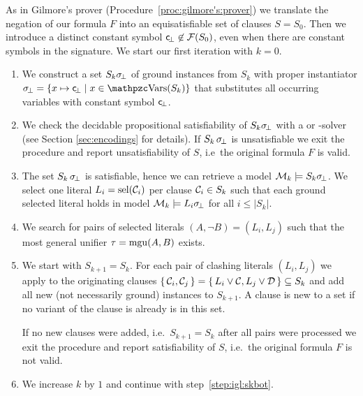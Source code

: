 \begin{procedure}\label{proc:inst:gen:loop}
	As in Gilmore's prover (Procedure~\ref{proc:gilmore's:prover})
	we translate the negation of our formula \( F \) into an equisatisfiable set of clauses
	\( S = S_0 \). Then we introduce a distinct constant symbol
	\( \mathsf{c} \!_\bot\not\in\mathcal{F}(S_0) \), even when there are constant symbols in the signature.
	We start our first iteration with \( k=0 \).

	\begin{enumerate}
		\item\label{step:igl:skbot}
		We construct a set \( S_{k}\sigma \!_\bot \) of ground instances from \( S_k \)
		with proper instantiator \( \subsbot = \{ x\mapsto \consbot \mid x\in\var(S_k) \} \)
		that substitutes all occurring variables with constant symbol \( \mathsf{c} \!_\bot \).
%
		\item\label{step:igl:sksat} 
		We check the decidable propositional satisfiability of
		\( S_k\sigma \!_\bot \) with a \SAT{} or \SMT{}-solver
		(see Section \vref{sec:encodings} for details).
		If \( S_k \, \sigma \!_\bot \) is unsatisfiable
		we exit the procedure 
		and report
		{ unsatisfiability} of \( S \), i.e~the original formula \( F \) is valid.

		\item\label{step:igl:model} The set \( S_k \, \sigma \!_\bot \) is satisfiable, hence we can retrieve a model \( \mathcal{M}_k \models S_k\sigma \!_\bot \).
		We select one literal \( L_i = \operatorname{sel}(\mathcal{C}_i) \) per clause \( \mathcal{C}_i \in S_k \)
		such that each ground selected literal holds in model
		\( \mathcal{M}_k\models L_i\sigma \!_\bot \) for all \( i \leq | S_k | \).

		\item\label{step:igl:clashes} We search for pairs of selected literals
		\( (A, \lnot B) = (L_i, L_j) \)
		such that the most general unifier \( \tau = \operatorname{mgu}(A,B) \) exists.

		\item We start with \( S_{k+1} = S_k \). For each pair of clashing literals
		\( (L_i, L_j) \)
		we apply \InstGen{} to the originating clauses
		\( \{ \, \mathcal{C}_{i}, \mathcal{C}_{j} \, \} = \{ \, L_i\lor\mathcal{C}, L_j\lor\mathcal{D} \, \} \subseteq S_k \)
		and add all new (not necessarily ground) instances to \( S_{k+1} \).
		A clause is new to a set if no variant of the clause is already is in this set.

		If no new clauses were added, i.e.~\( S_{k+1} = S_k \) after all pairs were processed we exit the procedure and report { satisfiability} of \( S \), i.e.~the original formula \( F \) is not valid.

		\item We increase \( k \) by \( 1 \) and continue with step~\ref{step:igl:skbot}.

	\end{enumerate}
\end{procedure}

